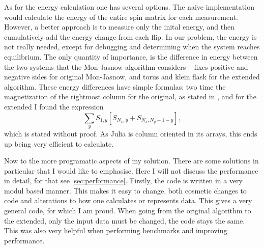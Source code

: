 \documentclass{article}
\begin{document}
As for the energy calculation one has several options.
The naive implementation would calculate the energy of the entire spin matrix for each measurement.
However, a better approach is to measure only the inital energy, and then cumulatively add the energy change from each flip.
In our problem, the energy is not really needed, except for debugging and determining when the system reaches equilibrium.
The only quantity of importance, is the difference in energy between the two systems that the Mon-Jasnow algorithm considers -- fixes positive and negative sides for original Mon-Jasnow, and torus and klein flask for the extended algorithm.
These energy differences have simple formulas: two time the magnetization of the rightmost column for the original, as stated in \cite{mon_jasnow}, and for the extended I found the expression
\begin{equation}
  \sum_y S_{1,y} [ S_{N_x, y} + S_{N_x, N_y+1-y} ],
\end{equation}
which is stated without proof.
As Julia is column oriented in its arrays, this ends up being very efficient to calculate.

Now to the more programatic aspects of my solution.
There are some solutions in particular that I would like to emphasise.
Here I will not discuss the performance in detail, for that see \ref{sec:performance}.
Firstly, the code is written in a very modul based manner.
This makes it easy to change, both cosmetic changes to code and alterations to how one calculates or represents data.
This gives a very general code, for which I am proud.
When going from the original algorithm to the extended, only the input data must be changed, the code stays the same.
This was also very helpful when performing benchmarks and improving performance.
\end{document}
